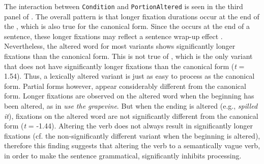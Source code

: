 \documentclass[output=paper
,modfonts
,nonflat]{langsci/langscibook}
\begin{document}
The interaction between \texttt{Condition} and \texttt{PortionAltered} is seen in the third panel of . The overall pattern is that longer fixation durations occur at the end of the , which is also true for the canonical form. Since the  occurs at the end of a sentence, these longer fixations may reflect a sentence wrap-up effect \citep{RaynerEtAl2000, HirotaniEtAl2006}. Nevertheless, the altered word for most variants shows significantly longer fixations than the canonical form. This is not true of , which is the only variant that does not have significantly longer fixations than the canonical form (\textit{t} = 1.54). Thus, a lexically altered variant is just as easy to process  as the canonical form. Partial forms  however, appear considerably different from the canonical form. Longer fixations are observed on the altered word when the beginning has been altered, as in \textit{use the grapevine}. But when the ending is altered (e.g., \textit{spilled it}), fixations on the altered word are not significantly different from the canonical form (\textit{t} = -1.44). Altering the verb does not always result in significantly longer fixations (cf. the non-significantly different  variant when the beginning is altered), therefore this finding suggests that altering the verb to a semantically vague verb, in order to make the sentence grammatical, significantly inhibits processing.
\end{document}
